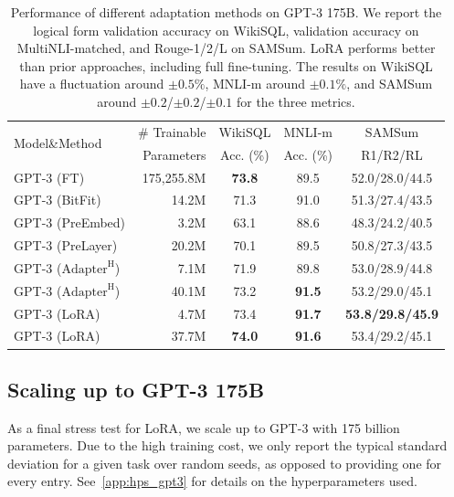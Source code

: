 






















\begin{table}[h]
  \centering
  \begin{tabular}{l|r|ccc}
  \hline
  \toprule
  \multirow{2}{*}{Model\&Method}  & \# Trainable &  WikiSQL & MNLI-m & SAMSum  \\ %
  \cline{3-5}
  & Parameters & Acc. (\%) & Acc. (\%) & R1/R2/RL \\
  \midrule
  GPT-3 (FT)                         & 175,255.8M &  \textbf{73.8}  &  89.5 & 52.0/28.0/44.5 \\
  GPT-3 (BitFit)                  & 14.2M & 71.3 & 91.0 & 51.3/27.4/43.5 \\
  GPT-3 (PreEmbed)                   & 3.2M  & 63.1 & 88.6 & 48.3/24.2/40.5 \\
  GPT-3 (PreLayer)                   & 20.2M & 70.1 & 89.5 & 50.8/27.3/43.5 \\
  GPT-3 ($\text{Adapter}^{\text{H}}$)& 7.1M  & 71.9 & 89.8 & 53.0/28.9/44.8  \\
  GPT-3 ($\text{Adapter}^{\text{H}}$)& 40.1M & 73.2 & \textbf{91.5} & 53.2/29.0/45.1  \\
  \midrule
  GPT-3 (LoRA)                       & 4.7M & 73.4 & \textbf{91.7} & \textbf{53.8/29.8/45.9} \\
  GPT-3 (LoRA)                       & 37.7M & \textbf{74.0} & \textbf{91.6} & 53.4/29.2/45.1 \\
  \bottomrule
  \end{tabular}
  \caption{Performance of different adaptation methods on GPT-3 175B. We report the logical form validation accuracy on WikiSQL, validation accuracy on MultiNLI-matched, and Rouge-1/2/L on SAMSum. LoRA performs better than prior approaches, including full fine-tuning. The results on WikiSQL have a fluctuation around $\pm0.5\%$, MNLI-m around $\pm0.1\%$, and SAMSum around $\pm0.2$/$\pm0.2$/$\pm0.1$ for the three metrics.}
  \label{tab:gpt3_ft_results}
\end{table}



\subsection{Scaling up to GPT-3 175B}
\label{sec:gpt3_expts}
As a final stress test for LoRA, we scale up to GPT-3 with 175 billion parameters.
Due to the high training cost, we only report the typical standard deviation for a given task over random seeds, as opposed to providing one for every entry.
See~\autoref{app:hps_gpt3} for details on the hyperparameters used.










